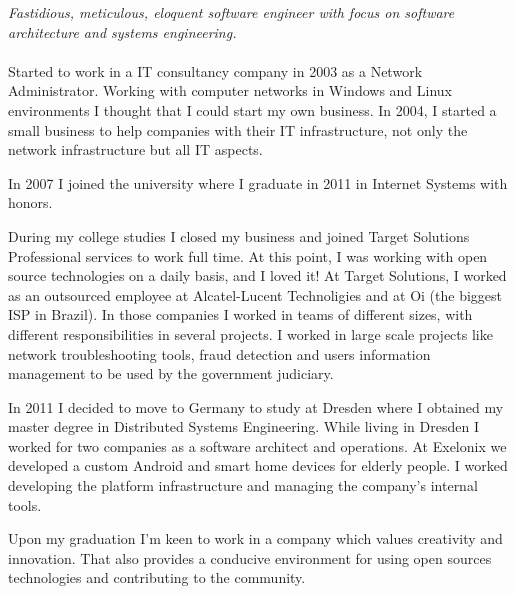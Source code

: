 \documentclass[10pt,a4paper]{article}
\newcommand*\acr[1]{\textscale{.85}{#1}}
\begin{document}
\vspace{-1.3em}  %
\begin{multicols}{2}  %
\noindent \emph{Fastidious, meticulous, eloquent software engineer with focus on software architecture and systems engineering.}
\\
\\
Started to work in a IT consultancy company in 2003 as a Network Administrator. Working with computer networks in Windows and Linux environments I thought that I could start my own business. In 2004, I started a small business to help companies with their IT infrastructure, not only the network infrastructure but all IT aspects.

In 2007 I joined the \acr{CEFET/RJ} university where I graduate in 2011 in Internet Systems with honors.

During my college studies I closed my business and joined Target Solutions Professional services to work full time. At this point, I was working with open source technologies on a daily basis, and I loved it! At Target Solutions, I worked as an outsourced employee at Alcatel-Lucent Technoligies and at Oi (the biggest ISP in Brazil). In those companies I worked in teams of different sizes, with different responsibilities in several projects. I worked in large scale projects like network troubleshooting tools, fraud detection and users information management to be used by the government judiciary.

In 2011 I decided to move to Germany to study at \acr{TU} Dresden where I obtained my master degree in Distributed Systems Engineering. While living in Dresden I worked for two companies as a software architect and operations. At Exelonix we developed a custom Android and smart home devices for elderly people. I worked developing the platform infrastructure and managing the company's internal tools.


Upon my graduation I'm keen to work in a company which values creativity and innovation. That also provides a conducive environment for using open sources technologies and contributing to the community.

\end{multicols}
\end{document}
